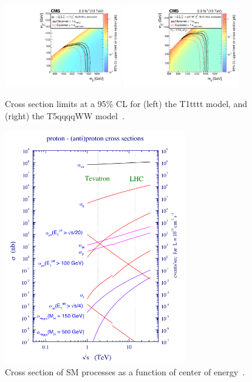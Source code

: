 \begin{figure}[!h]
  \includegraphics[width=0.45\textwidth]{Plots/analysis/results/CMS-SUS-15-006_Figure_007-a}
  \hfil
  \includegraphics[width=0.45\textwidth]{Plots/analysis/results/CMS-SUS-15-006_Figure_007-b}
\centering
  \caption{\label{fig:Moriond} Cross section limits at a 95\% CL for (left) the T1tttt model, and (right) the T5qqqqWW model~\cite{SUS_16_005}.
  }
\end{figure}
\begin{figure}[!h]
\centering
  \includegraphics[width=0.7\textwidth]{Plots/SM/SMxsec}
  \caption{ Cross section of SM processes as a function of center of energy~\cite{smxsec}.
  }
  \label{fig:sm_xsec}
\end{figure}
